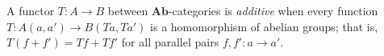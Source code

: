 A functor $T: A \to B$ between $\mathbf{Ab}$-categories is \emph{additive} when every function $T: A(a, a') \to B(Ta, Ta')$ is a homomorphism of abelian groups; that is, $T(f + f') = Tf + Tf'$ for all parallel pairs $f, f': a \to a'$.
